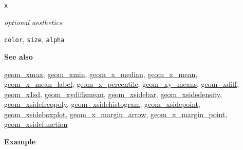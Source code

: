 \documentclass[
  letterpaper,
  DIV=11,
  numbers=noendperiod]{scrreprt}
\begin{document}
\texttt{x}

\emph{optional aesthetics}

\texttt{color}, \texttt{size}, \texttt{alpha}

\textbf{See also}

\href{@xmax}{geom\_xmax}, \href{@xmin}{geom\_xmin},
\href{@x_median}{geom\_x\_median}, \href{@x_mean}{geom\_x\_mean},
\href{@x_mean_label}{geom\_x\_mean\_label},
\href{@x_percentile}{geom\_x\_percentile},
\href{@xy_means}{geom\_xy\_means}, \href{@xdiff}{geom\_xdiff},
\href{@x1sd}{geom\_x1sd}, \href{@xydiffsmean}{geom\_xydiffsmean},
\href{@xsidebar}{geom\_xsidebar},
\href{@xsidedensity}{geom\_xsidedensity},
\href{@xsidefreqpoly}{geom\_xsidefreqpoly},
\href{@xsidehistogram}{geom\_xsidehistogram},
\href{@xsidepoint}{geom\_xsidepoint},
\href{@xsideboxplot}{geom\_xsideboxplot},
\href{@x_margin_arrow}{geom\_x\_margin\_arrow},
\href{@x_margin_point}{geom\_x\_margin\_point},
\href{@xsidefunction}{geom\_xsidefunction}

\textbf{Example }
\end{document}
